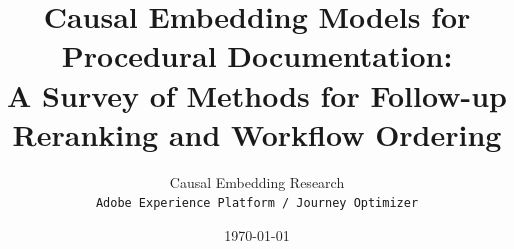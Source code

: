 \documentclass[10pt,twocolumn]{article}
\title{\textbf{Causal Embedding Models for Procedural Documentation:\\
A Survey of Methods for Follow-up Reranking and Workflow Ordering}}
\author{Causal Embedding Research \\ \texttt{Adobe Experience Platform / Journey Optimizer}}
\date{\today}
\begin{document}
\maketitle

\begin{abstract}

\end{abstract}


















\end{document}
